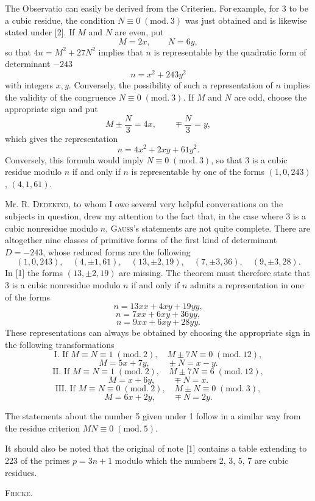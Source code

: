 
The Observatio can easily be derived from the Criterien. For\,example, for 3 to be a cubic residue,
the condition $N\equiv 0\;(\mathrm{mod.}\ 3)$ was just obtained and is likewise stated under [2]. If $M$ and $N$
are even, put
\[ M=2x,\qquad N=6y, \]
so that $4n=M^2+27N^2$ implies that $n$ is representable by the quadratic form of determinant $-243$
\[ n=x^2+243y^2 \]
with integers $x, y$. Conversely, the possibility of such a representation of $n$
implies the validity of the congruence $N\equiv 0\;(\mathrm{mod.}\ 3)$. If $M$ and $N$ are odd, choose the appropriate sign and put
\[ M\pm\dfrac{N}{3}=4x,\qquad \mp\dfrac{N}{3}=y, \]
which gives the representation
\[ n=4x^2+2xy+61y^2. \]
Conversely, this formula would imply $N\equiv 0\;(\mathrm{mod.}\ 3)$, so that 3 is a cubic residue
modulo $n$ if and only if $n$ is representable by one of the forms $(1,0,243)$, $(4,1,61)$.

Mr. R. \textsc{Dedekind}, to whom I owe several very helpful conversations on the subjects in question,
drew my attention to the fact that, in the case where
3 is a cubic nonresidue modulo $n$, \textsc{Gauss}'s statements are not quite complete. There are altogether nine classes of primitive forms of the first kind of determinant $D=-243$, whose reduced forms are the following
\[ (1,0,243),\quad (4,\pm1,61),\quad (13,\pm2,19),\quad (7,\pm3,36),\quad (9,\pm3,28). \]
In [1] the forms $(13,\pm2,19)$ are missing. The theorem must therefore state that 3 is a cubic
nonresidue modulo $n$ if and only if $n$ admits a representation in one of the forms
\[ n=13xx+4xy+19yy, \]
\[ n=7xx+6xy+36yy, \]
\[ n=9xx+6xy+28yy. \]
These representations can always be obtained by choosing the appropriate sign in the following transformations
\[ \text{I. If } M\equiv N\equiv 1\;(\mathrm{mod.}\ 2),\quad M\pm 7N\equiv 0\;(\mathrm{mod.}\ 12), \]
\[ M=5x+7y,\qquad \pm N=x-y. \]
\[ \text{II. If } M\equiv N\equiv 1\;(\mathrm{mod.}\ 2),\quad M\pm 7N\equiv 6\;(\mathrm{mod.}\ 12), \]
\[ M=x+6y,\qquad \mp N=x. \]
\[ \text{III. If } M\equiv N\equiv 0\;(\mathrm{mod.}\ 2),\quad M\pm N\equiv 0\;(\mathrm{mod.}\ 3), \]
\[ M=6x+2y,\qquad \mp N=2y. \]
\par\noindent\hspace*{\parindent}The statements about the number 5 given under 1 follow in a similar way from the residue criterion
$MN\equiv 0\;(\mathrm{mod.}\ 5)$.

It should also be noted that the original of note [1] contains a table extending to 223 of the primes $p=3n+1$ modulo which the numbers 2, 3, 5, 7 are cubic residues.

\hfill \textsc{Fricke.}

\endgroup
